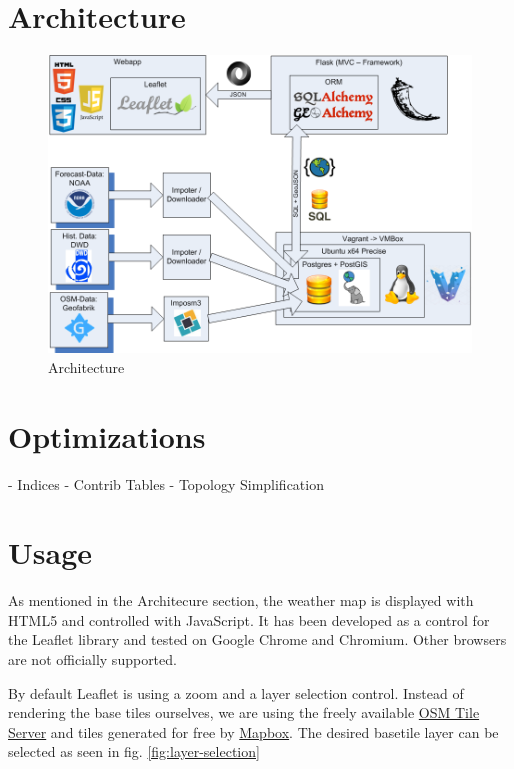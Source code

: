 \documentclass[paper=a4, fontsize=11pt]{scrartcl} %
\numberwithin{equation}{section} %
\numberwithin{figure}{section} %
\numberwithin{table}{section} %
\begin{document}
\section{Architecture}
\begin{figure}[htbp]
\includegraphics[width=1\textwidth]{pictures/Architektur.png}
\caption{Architecture}
\end{figure}

\section{Optimizations}
	- Indices
	- Contrib Tables
	- Topology Simplification
\section{Usage}\label{usage}

As mentioned in the Architecure section, the weather map is displayed
with HTML5 and controlled with JavaScript. It has been developed as a
control for the Leaflet library and tested on Google Chrome and
Chromium. Other browsers are not officially supported.

By default Leaflet is using a zoom and a layer selection control.
Instead of rendering the base tiles ourselves, we are using the freely
available
\href{http://wiki.openstreetmap.org/wiki/Tile_usage_policy}{OSM Tile
Server} and tiles generated for free by
\href{https://www.mapbox.com/}{Mapbox}. The desired basetile layer can
be selected as seen in fig. \ref{fig:layer-selection}
\end{document}
